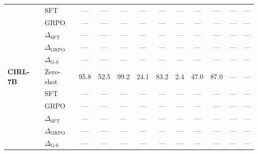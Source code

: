 \begin{table}[t]
\begin{tabular}{llcccccccccc}
 & SFT & --- & --- & --- & --- & --- & --- & --- & --- & --- & --- \\
 & GRPO & --- & --- & --- & --- & --- & --- & --- & --- & --- & --- \\
 & $\Delta_{\text{SFT}}$ & --- & --- & --- & --- & --- & --- & --- & --- & --- & --- \\
 & $\Delta_{\text{GRPO}}$ & --- & --- & --- & --- & --- & --- & --- & --- & --- & --- \\
 & $\Delta_{\text{G-S}}$ & --- & --- & --- & --- & --- & --- & --- & --- & --- & --- \\
\addlinespace
\textbf{CIRL-7B} & Zero-shot & 95.8 & 52.5 & 99.2 & 24.1 & 83.2 & 2.4 & 47.0 & 87.0 & --- & --- \\
 & SFT & --- & --- & --- & --- & --- & --- & --- & --- & --- & --- \\
 & GRPO & --- & --- & --- & --- & --- & --- & --- & --- & --- & --- \\
 & $\Delta_{\text{SFT}}$ & --- & --- & --- & --- & --- & --- & --- & --- & --- & --- \\
 & $\Delta_{\text{GRPO}}$ & --- & --- & --- & --- & --- & --- & --- & --- & --- & --- \\
 & $\Delta_{\text{G-S}}$ & --- & --- & --- & --- & --- & --- & --- & --- & --- & --- \\
\bottomrule
\end{tabular}
\end{table}